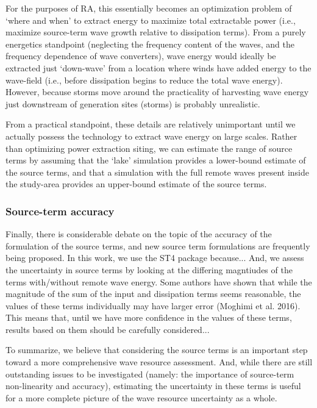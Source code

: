 \documentclass[authoryear,preprint]{elsarticle}
\begin{document}
For the purposes of RA, this essentially becomes an optimization problem of ‘where and when’ to extract energy to maximize total extractable power (i.e., maximize source-term wave growth relative to dissipation terms). From a purely energetics standpoint (neglecting the frequency content of the waves, and the frequency dependence of wave converters), wave energy would ideally be extracted just ‘down-wave’ from a location where winds have added energy to the wave-field (i.e., before dissipation begins to reduce the total wave energy). However, because storms move around the practicality of harvesting wave energy just downstream of generation sites (storms) is probably unrealistic.

From a practical standpoint, these details are relatively unimportant until we actually possess the technology to extract wave energy on large scales. Rather than optimizing power extraction siting, we can estimate the range of source terms by assuming that the ‘lake’ simulation provides a lower-bound estimate of the source terms, and that a simulation with the full remote waves present inside the study-area provides an upper-bound estimate of the source terms.

\subsubsection{Source-term accuracy}

Finally, there is considerable debate on the topic of the accuracy of the formulation of the source terms, and new source term formulations are frequently being proposed. In this work, we use the ST4 package because... And, we assess the uncertainty in source terms by looking at the differing magntiudes of the terms with/without remote wave energy. Some authors have shown that while the magnitude of the sum of the input and dissipation terms seems reasonable, the values of these terms individually may have larger error (Moghimi et al. 2016). This means that, until we have more confidence in the values of these terms, results based on them should be carefully considered...

To summarize, we believe that considering the source terms is an important step toward a more comprehensive wave resource assessment. And, while there are still outstanding issues to be investigated (namely: the importance of source-term non-linearity and accuracy), estimating the uncertainty in these terms is useful for a more complete picture of the wave resource uncertainty as a whole.
\end{document}
